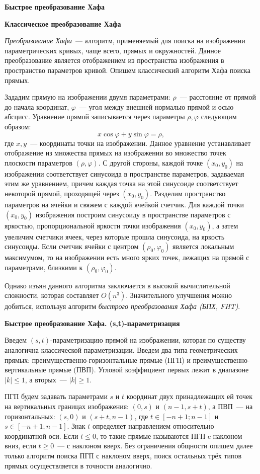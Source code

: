 \documentclass[a4paper,12pt]{article}
\begin{document}
{\bf\Large  Быстрое преобразование Хафа}

{\bf Классическое преобразование Хафа}

{\it Преобразование Хафа}~--- алгоритм, применяемый для поиска на изображении параметрических кривых, чаще всего, прямых и окружностей. Данное преобразование является отображением из пространства изображения в пространство параметров кривой. Опишем классический алгоритм Хафа поиска прямых.

Зададим прямую на изображении двумя параметрами: $\rho$~--- расстояние от прямой до начала координат, $\varphi$~--- угол между внешней нормалью прямой и осью абсцисс. Уравнение прямой записывается через параметры $\rho, \varphi$ следующим образом: $$ x \cos\varphi + y \sin\varphi = \rho, $$ где $x, y$~--- координаты точки на изображении. Данное уравнение устанавливает отображение из множества прямых на изображении во множество точек плоскости параметров $(\rho,\varphi)$. С другой стороны, каждой точке $(x_0,y_0)$ на изображении соответствует синусоида в пространстве параметров, задаваемая этим же уравнением, причем каждая точка на этой синусоиде соответствует некоторой прямой, проходящей через $(x_0,y_0)$. Разделим пространство параметров на ячейки и свяжем с каждой ячейкой счетчик. Для каждой точки $(x_0,y_0)$ изображения построим синусоиду в пространстве параметров с яркостью, пропорциональной яркости точки изображения $(x_0,y_0)$, а затем увеличим счетчики ячеек, через которые прошла синусоида, на яркость синусоиды. Если счетчик ячейки с центром $(\rho_0,\varphi_0)$ является локальным максимумом, то на изображении есть много ярких точек, лежащих на прямой с параметрами, близкими к $(\rho_0,\varphi_0)$.

Однако изъян данного алгоритма заключается в высокой вычислительной сложности, которая составляет $O(n^3)$. Значительного улучшения можно добиться, используя алгоритм {\it быстрого преобразования Хафа (БПХ, FHT)}.

{\bf Быстрое преобразование Хафа. (s,t)-параметризация}

Введем $(s, t)$-параметризацию прямой на изображении, которая по существу аналогична классической параметризации. Введем два типа геометрических прямых: преимущественно-горизонтальные прямые (ПГП) и преимущественно-вертикальные прямые (ПВП). Угловой коэффициент первых лежит в диапазоне $|k| \leq 1$, а вторых~--- $|k| \geq 1$.

ПГП будем задавать параметрами $s$ и $t$ координат двух принадлежащих ей точек на вертикальных границах изображения: $(0, s)$ и $(n - 1, s + t)$, а ПВП~--- на горизонтальных: $(s, 0)$ и $(s + t, n - 1)$, где $t \in [-n + 1; n - 1]$ и $s \in [-n + 1; n - 1]$. Знак $t$ определяет направлением относительно координатной оси. Если $t \leq 0$, то такие прямые называются ПГП c наклоном вниз, если $t \geq 0$~--- с наклоном вверх. Без ограничения общности опишем далее только алгоритм поиска ПГП с наклоном вверх, поиск остальных трёх типов прямых осуществляется в точности аналогично.
\end{document}
